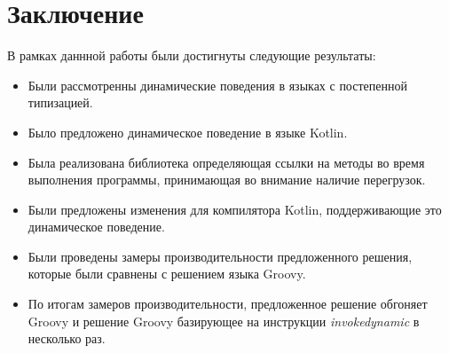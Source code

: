 \vfill
\clearpage
\section*{Заключение}



В рамках даннной работы были достигнуты следующие результаты:

\begin{itemize}
    \item Были рассмотренны динамические поведения в языках с постепенной типизацией.
    \item Было предложено динамическое поведение в языке Kotlin.
    \item Была реализована библиотека определяющая ссылки на методы во время выполнения программы, принимающая во внимание наличие перегрузок.
    \item Были предложены изменения для компилятора Kotlin, поддерживающие это динамическое поведение.
    \item Были проведены замеры производительности предложенного решения, которые были сравнены с решением языка Groovy.
        \item По итогам замеров производительности, предложенное решение обгоняет Groovy и решение Groovy базирующее на инструкции \textit{invokedynamic} в несколько раз.
\end{itemize}